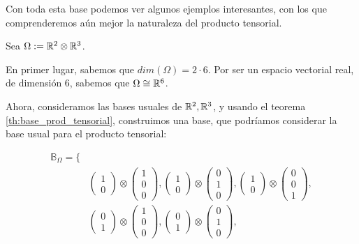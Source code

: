 Con toda esta base podemos ver algunos ejemplos interesantes, con los que comprenderemos aún mejor la naturaleza del producto tensorial.

\begin{ejemplo}
    Sea $\Omega := \mathbb{R}^2 \otimes \mathbb{R}^3$.

    En primer lugar, sabemos que $dim(\Omega) = 2 \cdot 6$. Por ser un espacio vectorial real, de dimensión $6$, sabemos que $\Omega \cong \mathbb{R}^6$.

    Ahora, consideramos las bases usuales de $\mathbb{R}^2, \mathbb{R}^3$, y usando el teorema \ref{th:base_prod_tensorial}, construimos una base, que podríamos considerar la base usual para el producto tensorial:

    \begin{equation}
    \begin{split}
    \mathbb{B}_{\Omega} = \{& \\
        & \begin{pmatrix}1 \\ 0 \end{pmatrix} \otimes \begin{pmatrix} 1 \\ 0 \\ 0 \end{pmatrix},
        \begin{pmatrix}1 \\ 0 \end{pmatrix} \otimes \begin{pmatrix} 0 \\ 1 \\ 0 \end{pmatrix},
        \begin{pmatrix}1 \\ 0 \end{pmatrix} \otimes \begin{pmatrix} 0 \\ 0 \\ 1 \end{pmatrix}, \\
        & \begin{pmatrix}0 \\ 1 \end{pmatrix} \otimes \begin{pmatrix} 1 \\ 0 \\ 0 \end{pmatrix},
        \begin{pmatrix}0 \\ 1 \end{pmatrix} \otimes \begin{pmatrix} 0 \\ 1 \\ 0 \end{pmatrix},

\end{split}
\end{equation}
\end{ejemplo}
